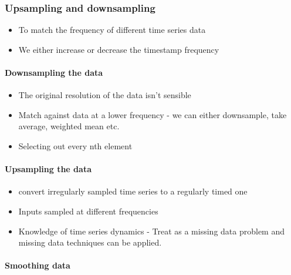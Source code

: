 \documentclass[
  letterpaper,
  DIV=11,
  numbers=noendperiod]{scrartcl}
\let\oldparagraph\paragraph
\renewcommand{\paragraph}[1]{\oldparagraph{#1}\mbox{}}
\providecommand{\tightlist}{%
  \setlength{\itemsep}{0pt}\setlength{\parskip}{0pt}}\usepackage{longtable,booktabs,array}
\begin{document}
\hypertarget{upsampling-and-downsampling}{%
\subsubsection{Upsampling and
downsampling}\label{upsampling-and-downsampling}}

\begin{itemize}
\tightlist
\item
  To match the frequency of different time series data
\item
  We either increase or decrease the timestamp frequency
\end{itemize}

\hypertarget{downsampling-the-data}{%
\paragraph{Downsampling the data}\label{downsampling-the-data}}

\begin{itemize}
\tightlist
\item
  The original resolution of the data isn't sensible
\item
  Match against data at a lower frequency - we can either downsample,
  take average, weighted mean etc.
\item
  Selecting out every nth element
\end{itemize}

\hypertarget{upsampling-the-data}{%
\paragraph{Upsampling the data}\label{upsampling-the-data}}

\begin{itemize}
\tightlist
\item
  convert irregularly sampled time series to a regularly timed one
\item
  Inputs sampled at different frequencies
\item
  Knowledge of time series dynamics - Treat as a missing data problem
  and missing data techniques can be applied.
\end{itemize}

\hypertarget{smoothing-data}{%
\paragraph{Smoothing data}\label{smoothing-data}}
\end{document}
